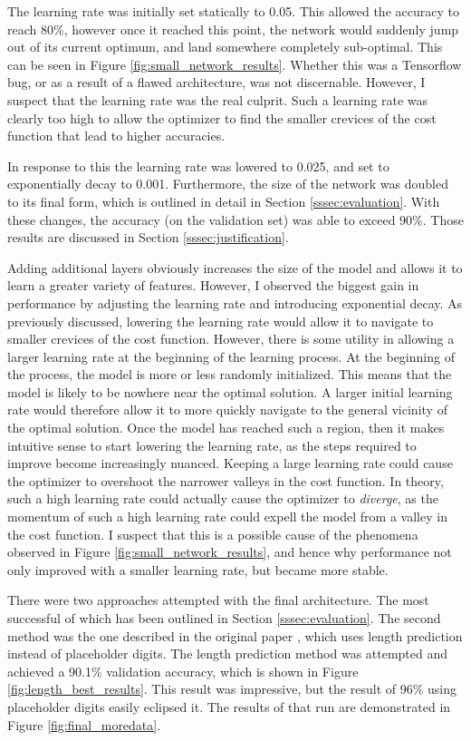 \documentclass[12pt]{article}
\begin{document}
The learning rate was initially set statically to 0.05.
This allowed the accuracy to reach 80\%, however once it reached this point, the network would suddenly jump out of its current optimum, and land somewhere completely sub-optimal. 
This can be seen in Figure \ref{fig:small_network_results}.
Whether this was a Tensorflow bug, or as a result of a flawed architecture, was not discernable.
However, I suspect that the learning rate was the real culprit.
Such a learning rate was clearly too high to allow the optimizer to find the smaller crevices of the cost function that lead to higher accuracies.

In response to this the learning rate was lowered to 0.025, and set to exponentially decay to 0.001.
Furthermore, the size of the network was doubled to its final form, which is outlined in detail in Section \ref{sssec:evaluation}.
With these changes, the accuracy (on the validation set) was able to exceed 90\%. 
Those results are discussed in Section \ref{sssec:justification}.

Adding additional layers obviously increases the size of the model and allows it to learn a greater variety of features.
However, I observed the biggest gain in performance by adjusting the learning rate and introducing exponential decay.
As previously discussed, lowering the learning rate would allow it to navigate to smaller crevices of the cost function.
However, there is some utility in allowing a larger learning rate at the beginning of the learning process. 
At the beginning of the process, the model is more or less randomly initialized.
This means that the model is likely to be nowhere near the optimal solution.
A larger initial learning rate would therefore allow it to more quickly navigate to the general vicinity of the optimal solution.
Once the model has reached such a region, then it makes intuitive sense to start lowering the learning rate, as the steps required to improve become increasingly nuanced.
Keeping a large learning rate could cause the optimizer to overshoot the narrower valleys in the cost function.
In theory, such a high learning rate could actually cause the optimizer to \textit{diverge}, as the momentum of such a high learning rate could expell the model from a valley in the cost function.
I suspect that this is a possible cause of the phenomena observed in Figure \ref{fig:small_network_results}, and hence why performance not only improved with a smaller learning rate, but became more stable.

There were two approaches attempted with the final architecture.
The most successful of which has been outlined in Section \ref{sssec:evaluation}.
The second method was the one described in the original paper \cite{svhn_original_paper}, which uses length prediction instead of placeholder digits.
The length prediction method was attempted and achieved a 90.1\% validation accuracy, which is shown in Figure \ref{fig:length_best_results}.
This result was impressive, but the result of 96\% using placeholder digits easily eclipsed it.
The results of that run are demonstrated in Figure \ref{fig:final_moredata}.
\end{document}
